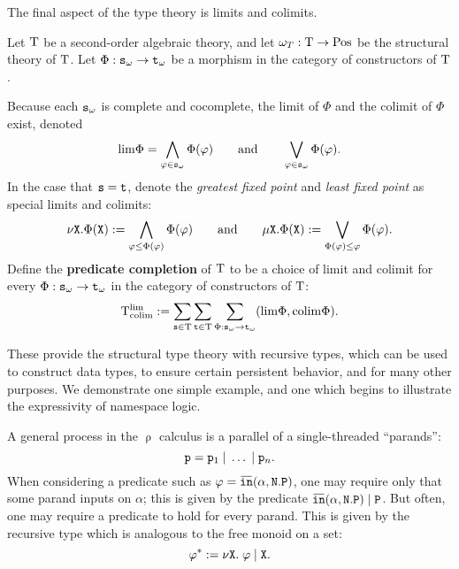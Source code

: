 The final aspect of the type theory is limits and colimits.

\begin{definition}
  \label{sec:comp}
  Let $\mathrm{T}$ be a second-order algebraic theory, and let $\omega_T:\mathrm{T}\to \mathrm{Pos}$ be the structural theory of $\mathrm{T}$. Let $\Phi:\mathtt{s}_\omega\to \mathtt{t}_\omega$ be a morphism in the category of constructors of $\mathrm{T}$.

  Because each $\mathtt{s}_\omega$ is complete and cocomplete, the limit of $\Phi$ and the colimit of $\Phi$ exist, denoted
$$\mathrm{lim}\Phi = \bigwedge_{\varphi\in \mathtt{s}_\omega}\Phi(\varphi)\quad\quad \text{and}\quad\quad \bigvee_{\varphi\in \mathtt{s}_\omega}\Phi(\varphi).$$
In the case that $\mathtt{s}=\mathtt{t}$, denote the \textit{greatest fixed point} and \textit{least fixed point} as special limits and colimits:
$$\nu\mathtt{X}.\Phi(\mathtt{X}):= \bigwedge_{\varphi\leq\Phi(\varphi)}\Phi(\varphi)\quad\quad\text{and}\quad\quad \mu\mathtt{X}.\Phi(\mathtt{X}):= \bigvee_{\Phi(\varphi)\leq \varphi}\Phi(\varphi).$$
Define the \textbf{predicate completion} of $\mathrm{T}$ to be a choice of limit and colimit for every $\Phi:\mathtt{s}_\omega\to \mathtt{t}_\omega$ in the category of constructors of $\mathrm{T}$:
$$\mathrm{T}_{\mathrm{colim}}^{\mathrm{lim}}:= \sum_{\mathtt{s}\in \mathrm{T}}\sum_{\mathtt{t}\in \mathrm{T}}\sum_{\Phi:\mathtt{s}_\omega\to \mathtt{t}_\omega}(\mathrm{lim}\Phi,\mathrm{colim}\Phi).$$
\end{definition}

These provide the structural type theory with recursive types, which can be used to construct data types, to ensure certain persistent behavior, and for many other purposes. We demonstrate one simple example, and one which begins to illustrate the expressivity of namespace logic.

\begin{example}
  A general process in the $\uprho$ calculus is a parallel of a single-threaded ``parands'':
$$\mathtt{p} = \mathtt{p}_1\mathtt{\; \vert \; } \dots \mathtt{\; \vert \; } \mathtt{p}_n.$$
  When considering a predicate such as $\varphi=\ob{\tti}(\alpha,\N.\PP)$, one may require only that some parand inputs on $\alpha$; this is given by the predicate $\ob{\tti}(\alpha,\N.\PP)\ttp\PP$. But often, one may require a predicate to hold for every parand.
  This is given by the recursive type which is analogous to the free monoid on a set:
$$\varphi^*:= \nu\mathtt{X}.\; \varphi\mathtt{\; \vert \; } \mathtt{X}.$$
\end{example}
  
